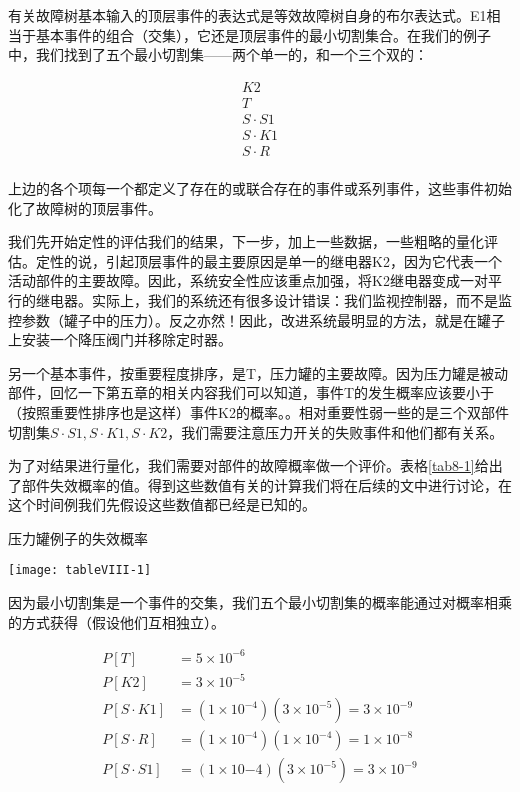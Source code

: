 \documentclass[cn,11pt,chinese]{elegantbook}
\begin{document}
{有关故障树基本输入的顶层事件的表达式是等效故障树自身的布尔表达式。E1相当于基本事件的组合（交集），它还是顶层事件的最小切割集合。在我们的例子中，我们找到了五个最小切割集——两个单一的，和一个三个双的：

\begin{align*}
K2  \\
T   \\
S\cdot S1   \\
S\cdot K1   \\
S\cdot R    \\
\end{align*}

上边的各个项每一个都定义了存在的或联合存在的事件或系列事件，这些事件初始化了故障树的顶层事件。

我们先开始定性的评估我们的结果，下一步，加上一些数据，一些粗略的量化评估。定性的说，引起顶层事件的最主要原因是单一的继电器K2，因为它代表一个活动部件的主要故障。因此，系统安全性应该重点加强，将K2继电器变成一对平行的继电器。实际上，我们的系统还有很多设计错误：我们监视控制器，而不是监控参数（罐子中的压力）。反之亦然！因此，改进系统最明显的方法，就是在罐子上安装一个降压阀门并移除定时器。

另一个基本事件，按重要程度排序，是T，压力罐的主要故障。因为压力罐是被动部件，回忆一下第五章的相关内容我们可以知道，事件T的发生概率应该要小于（按照重要性排序也是这样）事件K2的概率。。相对重要性弱一些的是三个双部件切割集$S\cdot S1, S\cdot K1, S\cdot K2$，我们需要注意压力开关的失败事件和他们都有关系。

为了对结果进行量化，我们需要对部件的故障概率做一个评价。表格\ref{tab8-1}给出了部件失效概率的值。得到这些数值有关的计算我们将在后续的文中进行讨论，在这个时间例我们先假设这些数值都已经是已知的。

\begin{table}[H]
	\centering
		\caption{压力罐例子的失效概率}
	\label{tab8-1}
	\texttt{[image: tableVIII-1]}
\end{table}

因为最小切割集是一个事件的交集，我们五个最小切割集的概率能通过对概率相乘的方式获得（假设他们互相独立）。


\begin{align*}
P[T]    &=5\times 10^{-6}   \\
P[K2]  &=3\times 10^{-5}   \\
P[S\cdot K1]    &=(1\times 10^{-4})(3\times 10^{-5})=3\times 10^{-9}    \\
P[S\cdot R] &= (1\times 10^{-4})(1\times 10^{-4})=1\times 10^{-8}   \\
P[S\cdot S1] &=(1\times 10{-4})(3\times 10^{-5})=3\times 10^{-9}    \\
\end{align*}


}
\end{document}
